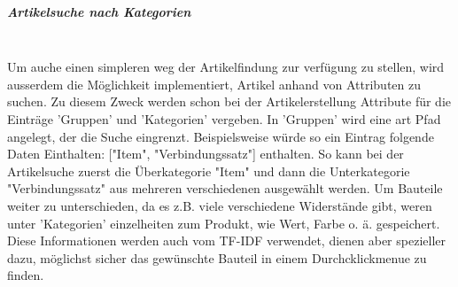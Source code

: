 \subparagraph{Artikelsuche nach Kategorien}\mbox{}\\
Um auche einen simpleren weg der Artikelfindung zur verfügung zu stellen, wird ausserdem die Möglichkeit implementiert, Artikel anhand von Attributen zu suchen. Zu diesem Zweck werden schon bei der Artikelerstellung Attribute für die Einträge 'Gruppen' und 'Kategorien' vergeben. In 'Gruppen' wird eine art Pfad angelegt, der die Suche eingrenzt. Beispielsweise würde so ein Eintrag folgende Daten Einthalten: ["Item", "Verbindungssatz"] enthalten. So kann bei der Artikelsuche zuerst die Überkategorie "Item" und dann die Unterkategorie "Verbindungssatz" aus mehreren verschiedenen ausgewählt werden. Um Bauteile weiter zu unterschieden, da es z.B. viele verschiedene Widerstände gibt, weren unter 'Kategorien' einzelheiten zum Produkt, wie Wert, Farbe o. ä. gespeichert.\\ 
Diese Informationen werden auch vom TF-IDF verwendet, dienen aber spezieller dazu, möglichst sicher das gewünschte Bauteil in einem Durchcklickmenue zu finden.



